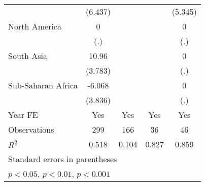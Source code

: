 \begin{table}[htbp]
\begin{tabular}{l*{4}{c}}
                &  (6.437)         &                  &                  &  (5.345)         \\
\addlinespace
North America   &        0         &                  &                  &        0         \\
                &      (.)         &                  &                  &      (.)         \\
\addlinespace
South Asia      &    10.96\sym{**} &                  &                  &        0         \\
                &  (3.783)         &                  &                  &      (.)         \\
\addlinespace
Sub-Saharan Africa&   -6.068         &                  &                  &        0         \\
                &  (3.836)         &                  &                  &      (.)         \\
\addlinespace
Year FE         &      Yes         &      Yes         &      Yes         &      Yes         \\
\midrule
Observations    &      299         &      166         &       36         &       46         \\
\(R^{2}\)       &    0.518         &    0.104         &    0.827         &    0.859         \\
\bottomrule
\multicolumn{5}{l}{\footnotesize Standard errors in parentheses}\\
\multicolumn{5}{l}{\footnotesize \sym{*} \(p<0.05\), \sym{**} \(p<0.01\), \sym{***} \(p<0.001\)}\\
\end{tabular}
\end{table}
